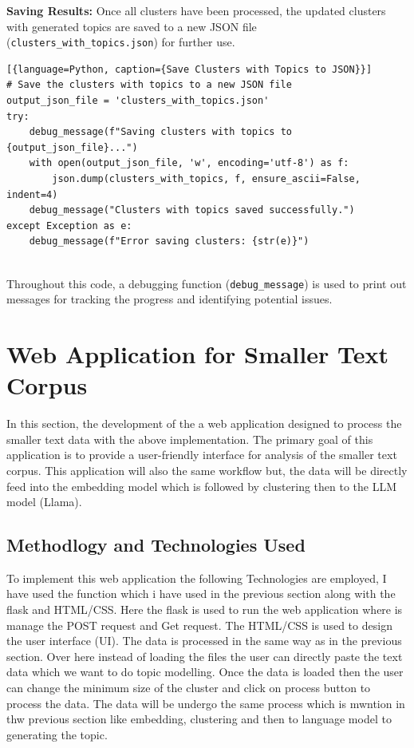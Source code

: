 \noindent\textbf{Saving Results:} Once all clusters have been processed, the updated clusters with generated topics 
are saved to a new JSON file (\texttt{clusters\_with\_topics.json}) for further use.
\begin{lstlisting}[{language=Python, caption={Save Clusters with Topics to JSON}}]  
# Save the clusters with topics to a new JSON file
output_json_file = 'clusters_with_topics.json'
try:
    debug_message(f"Saving clusters with topics to {output_json_file}...")
    with open(output_json_file, 'w', encoding='utf-8') as f:
        json.dump(clusters_with_topics, f, ensure_ascii=False, indent=4)
    debug_message("Clusters with topics saved successfully.")
except Exception as e:
    debug_message(f"Error saving clusters: {str(e)}")
    
\end{lstlisting}
Throughout this code, a debugging function (\texttt{debug\_message}) is used to print out messages for tracking the 
progress and identifying potential issues.

\vspace{5cm}

\section{Web Application for Smaller Text Corpus}

In this section, the development of the a web application designed to process the smaller text data with the above implementation.
The primary goal of this application is to provide a user-friendly interface for analysis of the smaller text corpus. This application
will also the same workflow but, the data will be directly feed into the embedding model which is followed by clustering then to the 
LLM model (Llama).

\subsection{Methodlogy and Technologies Used}
To implement this web application the following Technologies are employed, I have used the function which i have used in 
the previous section along with the flask and HTML/CSS. Here the flask is used to run the web application where is manage the 
POST request and Get request. The HTML/CSS is used to design the user interface (UI). The data is processed in the same way 
as in the previous section.
Over here instead of loading the files the user can directly paste the text data which we want to do topic modelling. 
Once the data is loaded then the user can change the minimum size of the cluster and click on process button to process the data. 
The data will be undergo the same process which is mwntion in thw previous section like embedding, clustering and then
to language model to generating the topic. 

